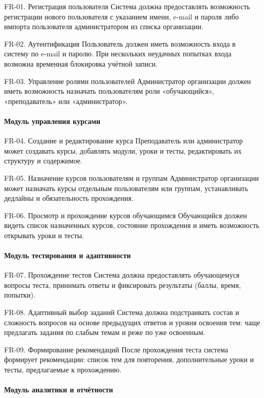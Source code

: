 \documentclass{G7-32}
\begin{document}
FR-01. Регистрация пользователя  
Система должна предоставлять возможность регистрации нового пользователя с указанием имени, e-mail и пароля либо импорта пользователя администратором из списка организации.

FR-02. Аутентификация  
Пользователь должен иметь возможность входа в систему по e-mail и паролю. При нескольких неудачных попытках входа возможна временная блокировка учётной записи.

FR-03. Управление ролями пользователей  
Администратор организации должен иметь возможность назначать пользователям роли «обучающийся», «преподаватель» или «администратор».

\paragraph{Модуль управления курсами}

FR-04. Создание и редактирование курса  
Преподаватель или администратор может создавать курсы, добавлять модули, уроки и тесты, редактировать их структуру и содержимое.

FR-05. Назначение курсов пользователям и группам  
Администратор организации может назначать курсы отдельным пользователям или группам, устанавливать дедлайны и обязательность прохождения.

FR-06. Просмотр и прохождение курсов обучающимся  
Обучающийся должен видеть список назначенных курсов, состояние прохождения и иметь возможность открывать уроки и тесты.

\paragraph{Модуль тестирования и адаптивности}

FR-07. Прохождение тестов  
Система должна предоставлять обучающемуся вопросы теста, принимать ответы и фиксировать результаты (баллы, время, попытки).

FR-08. Адаптивный выбор заданий  
Система должна подстраивать состав и сложность вопросов на основе предыдущих ответов и уровня освоения тем: чаще предлагать задания по слабым темам и реже по уже освоенным.

FR-09. Формирование рекомендаций  
После прохождения теста система формирует рекомендации: список тем для повторения, дополнительные уроки и тесты, предлагаемые к прохождению.

\paragraph{Модуль аналитики и отчётности}
\end{document}
